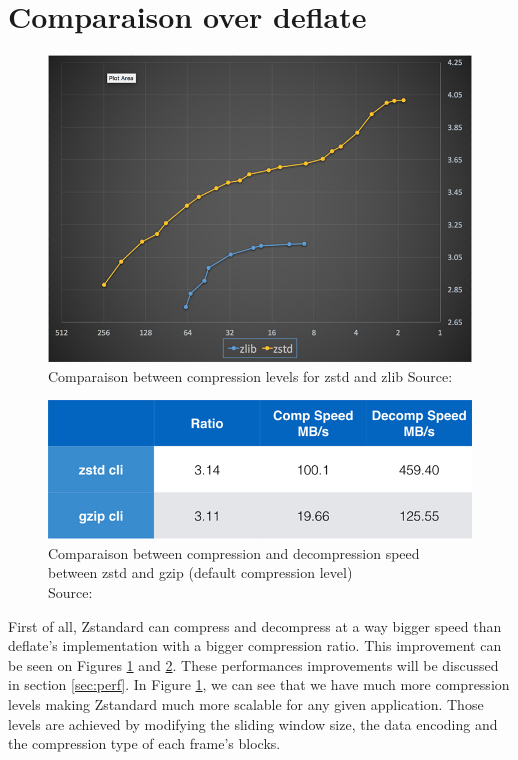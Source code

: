 \documentclass{sig-alternate-05-2015}
\begin{document}
\section{Comparaison over deflate}
    \begin{figure}
        \centering
        \includegraphics[scale=0.5]{speed.jpg}
        \caption{Comparaison between compression levels for zstd and zlib \newline
        Source: \cite{presentation}}
        \label{fig:level}
    \end{figure}
    \begin{figure}
        \centering
        \includegraphics[scale=0.25]{speed_comp.jpg}
        \caption{Comparaison between compression and decompression speed between zstd and gzip
        (default compression level) \\ Source: \cite{presentation}}
        \label{fig:speed}
    \end{figure}
    First of all, Zstandard can compress and decompress at a way bigger speed than
    deflate's implementation with a bigger compression ratio. This improvement can be seen on Figures
    \ref{fig:level} and \ref{fig:speed}. These performances improvements will be discussed in section
    \ref{sec:perf}. In Figure \ref{fig:level}, we can see that we have much more compression levels
    making Zstandard much more scalable for any given application. Those levels are achieved by
    modifying the sliding window size, the data encoding and the compression type of each frame's
    blocks.
\end{document}
